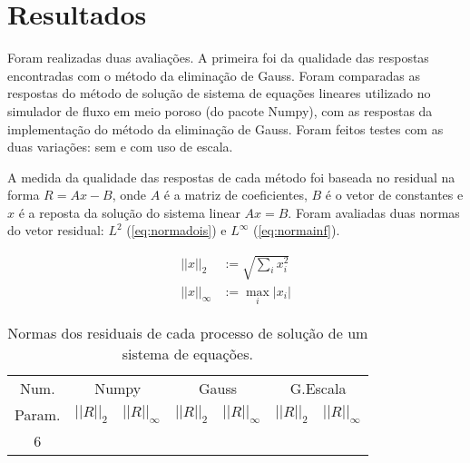 \documentclass[final,5p]{elsarticle}
\numberwithin{equation}{section}
\begin{document}
\section{Resultados}

        Foram realizadas duas avaliações. A primeira foi da qualidade das respostas encontradas com o método da eliminação de Gauss. Foram comparadas as respostas do método de solução de sistema de equações lineares utilizado no simulador de fluxo em meio poroso (do pacote Numpy), com as respostas da implementação do método da eliminação de Gauss. Foram feitos testes com as duas variações: sem e com uso de escala.

        A medida da qualidade das respostas de cada método foi baseada no residual na forma $R = Ax-B$, onde $A$ é a matriz de coeficientes, $B$ é o vetor de constantes e $x$ é a reposta da solução do sistema linear $Ax=B$. Foram avaliadas duas normas do vetor residual: $L^2$ (\ref{eq:normadois}) e $L^\infty$ (\ref{eq:normainf}).

        \begin{align}
            ||x||_2 &:= \sqrt{\sum_{i}x_i^2} \label{eq:normadois} \\
            ||x||_\infty &:= \max_{i} |x_i| \label{eq:normainf}
        \end{align}


        \begin{table}
            \centering
            \caption{Normas dos residuais de cada processo de solução de um sistema de equações.}
            \label{tab:respostas}
            \bigskip
            \small
            \begin{tabular}{c|cc|cc|cc}
                Num. & \multicolumn{2}{c|}{Numpy} & \multicolumn{2}{c|}{Gauss} & \multicolumn{2}{c}{G.Escala} \\
                Param. & $||R||_2$ & $||R||_\infty$ & $||R||_2$ & $||R||_\infty$ & $||R||_2$ & $||R||_\infty$ \\
                \hline
                6 &
            \end{tabular}
        \end{table}
\end{document}
